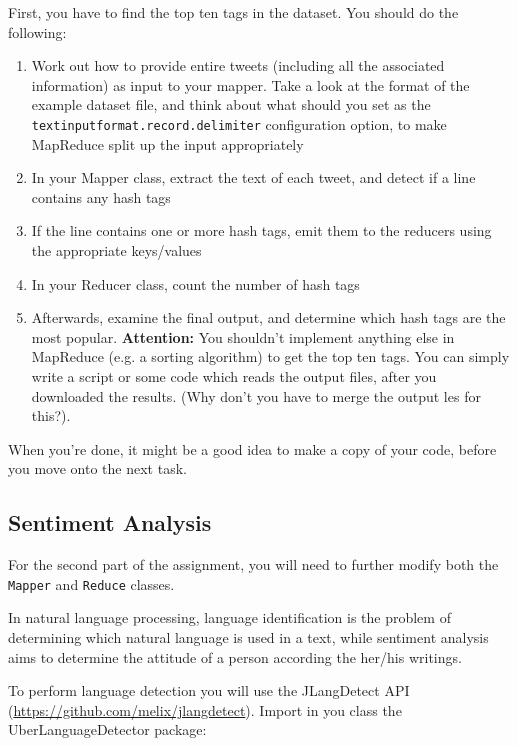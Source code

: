 \documentclass[a4paper,10pt]{article}
\begin{document}
  First, you have to find the top ten tags in the dataset. You should do the following: 
  
  \begin{enumerate}
    \item Work out how to provide entire tweets (including all the associated information) as input to your mapper. Take a look at the format of the example dataset file, and think about what should you set as the \texttt{textinputformat.record.delimiter} configuration option, to make MapReduce split up the input appropriately 
    
    \item In your Mapper class, extract the text of each tweet, and detect if a line contains any hash tags
    
    \item If the line contains one or more hash tags, emit them to the reducers using the appropriate keys/values
    
    \item In your Reducer class, count the number of hash tags
    
    \item Afterwards, examine the final output, and determine which hash tags are the most popular. \textbf{ Attention:} You shouldn't implement anything else in MapReduce (e.g. a sorting algorithm) to get the top ten tags. You can simply write a script or some code which reads the output files, after you downloaded the results. (Why don't you have to merge the output les for this?). 
  \end{enumerate}
  
  When you're done, it might be a good idea to make a copy of your code, before you move onto the next task.
  
  
  \subsection{Sentiment Analysis}
  For the second part of the assignment, you will need to further modify both the \texttt{Mapper} and \texttt{Reduce} classes.
  
  In natural language processing, language identification is the problem of determining which natural language is used in a text, while sentiment analysis aims to determine the attitude of a person according the her/his writings. 
  
  
  To perform language detection you will use the JLangDetect API (\url{https://github.com/melix/jlangdetect}). Import in you class the UberLanguageDetector package: 
  
\end{document}
